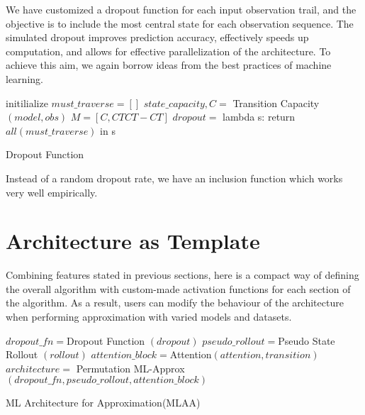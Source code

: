 \documentclass[10pt, conference, compsocconf]{IEEEtran}
\begin{document}
We have customized a dropout function for each input observation trail, and the objective is to include the most central state for each observation sequence. The simulated dropout improves prediction accuracy, effectively speeds up computation, and allows for effective parallelization of the architecture. To achieve this aim, we again borrow ideas from the best practices of machine learning. 

\begin{algorithm}[h]
initilialize $must\_traverse =[]$\;
$state\_capacity, C = $ {\sc Transition Capacity} $(model, obs)$ \;
$M = [C ,CTCT-CT]$ \;
$dropout = $ lambda s: return $all(must\_traverse)$ in s\;
\caption{{\sc Dropout Function}}
\label{algo:dropout_function}
\end{algorithm}

Instead of a random dropout rate, we have an inclusion function which works very well empirically.

\section{Architecture as Template}
Combining features stated in previous sections, here is a compact way of defining the overall algorithm with custom-made activation functions for each section of the algorithm. As a result, users can modify the behaviour of the architecture when performing approximation with varied models and datasets. 

\begin{algorithm}[h]
$dropout\_fn = ${\sc Dropout Function} $(dropout)$ \;
$pseudo\_rollout  = ${\sc Pseudo State Rollout} $(rollout)$ \;
$attention\_block = ${\sc Attention}$(attention, transition)$ \;
$architecture = $ {\sc Permutation ML-Approx} $(dropout\_fn, pseudo\_rollout, attention\_block)$ \; 
\caption{{\sc ML Architecture for Approximation(MLAA)}}
\label{algo:arch_template}
\end{algorithm}
\end{document}
